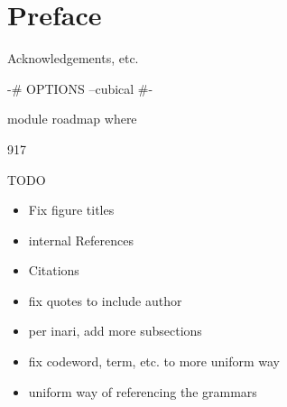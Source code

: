 \documentclass[11pt, a4paper]{article}
\begin{document}
\section*{Preface}

Acknowledgements, etc.

\thispagestyle{empty}

\newpage

\begin{spacing}{0.0}
\tableofcontents
\end{spacing}

\thispagestyle{empty}

\newpage
\setcounter{page}{1}

\begin{code}[hide]
{-# OPTIONS --cubical #-}

module roadmap where
\end{code}

917

TODO
\begin{itemize}
\item  Fix figure titles
\item internal References
\item Citations
\item fix quotes to include author
\item per inari, add more subsections
\item fix codeword, term, etc. to more uniform way
\item uniform way of referencing the grammars
\end{itemize}

















% 




\newpage




\newpage


\end{document}
